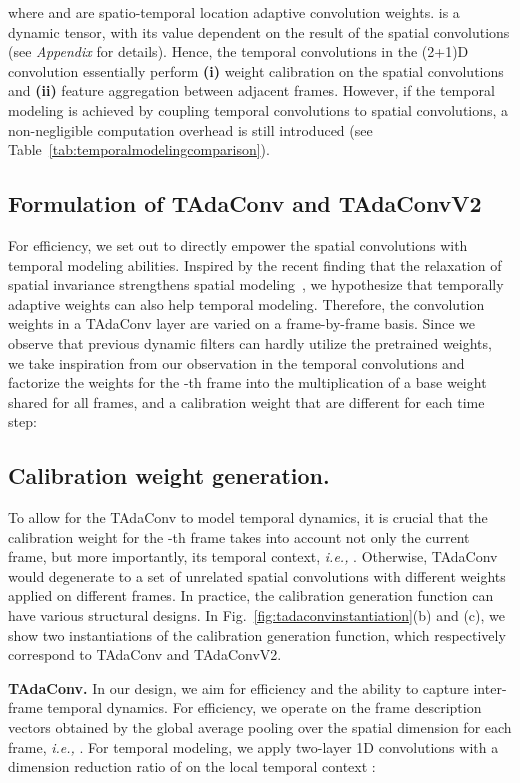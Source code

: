 \documentclass[10pt,journal,compsoc]{IEEEtran}
\begin{document}
\noindent where  and  are spatio-temporal location adaptive convolution weights.  is a dynamic tensor, with its value dependent on the result of the spatial convolutions (see \textit{Appendix} for details). Hence, the temporal convolutions in the (2+1)D convolution essentially perform \textbf{(i)} weight calibration on the spatial convolutions and \textbf{(ii)} feature aggregation between adjacent frames. 
However, if the temporal modeling is achieved by coupling temporal convolutions to spatial convolutions, a non-negligible computation overhead is still introduced (see Table~\ref{tab:temporalmodelingcomparison}). 

\subsection{Formulation of TAdaConv and TAdaConvV2}
\label{Sec:TempVariance}
For efficiency, we set out to directly empower the spatial convolutions with temporal modeling abilities. 
Inspired by the recent finding that the relaxation of spatial invariance strengthens spatial modeling~\cite{ddf,lrlc}, we hypothesize that temporally adaptive weights can also help temporal modeling. 
Therefore, the convolution weights in a TAdaConv layer are varied on a frame-by-frame basis.
Since we observe that previous dynamic filters can hardly utilize the pretrained weights, we take inspiration from our observation in the temporal convolutions and factorize the weights for the -th frame  into the multiplication of a base weight  shared for all frames, and a calibration weight  that are different for each time step:

\subsection{Calibration weight generation. }
\label{Sec:Calibration_weight_generation}
To allow for the TAdaConv to model temporal dynamics, it is crucial that the calibration weight  for the -th frame takes into account not only the current frame, but more importantly, its temporal context, \textit{i.e.,} .
Otherwise, TAdaConv would degenerate to a set of unrelated spatial convolutions with different weights applied on different frames.
In practice, the calibration generation function can have various structural designs. In Fig.~\ref{fig:tadaconvinstantiation}(b) and (c), we show two instantiations of the calibration generation function, which respectively correspond to TAdaConv and TAdaConvV2. 


\noindent\textbf{TAdaConv.} In our design, we aim for efficiency and the ability to capture inter-frame temporal dynamics. 
For efficiency, we operate on the frame description vectors  obtained by the global average pooling over the spatial dimension  for each frame, \textit{i.e.,} .
For temporal modeling, we apply two-layer 1D convolutions  with a dimension reduction ratio of  on the local temporal context :
\end{document}
